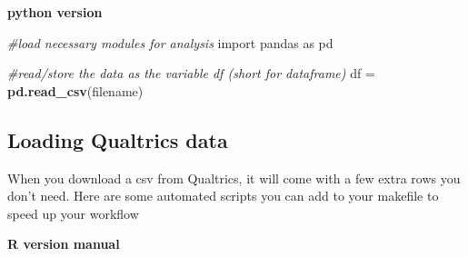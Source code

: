 \documentclass[]{book}
\newenvironment{Shaded}{\begin{snugshade}}{\end{snugshade}}
\newcommand{\CommentTok}[1]{\textcolor[rgb]{0.56,0.35,0.01}{\textit{#1}}}
\newcommand{\DataTypeTok}[1]{\textcolor[rgb]{0.13,0.29,0.53}{#1}}
\newcommand{\DecValTok}[1]{\textcolor[rgb]{0.00,0.00,0.81}{#1}}
\newcommand{\KeywordTok}[1]{\textcolor[rgb]{0.13,0.29,0.53}{\textbf{#1}}}
\newcommand{\NormalTok}[1]{#1}
\newcommand{\OperatorTok}[1]{\textcolor[rgb]{0.81,0.36,0.00}{\textbf{#1}}}
\newcommand{\StringTok}[1]{\textcolor[rgb]{0.31,0.60,0.02}{#1}}
\begin{document}
\textbf{python version}

\begin{Shaded}
\begin{Highlighting}[]
\CommentTok{#load necessary modules for analysis}
\NormalTok{import pandas as pd}

\CommentTok{#read/store the data as the variable df (short for dataframe)}
\NormalTok{df =}\StringTok{ }\KeywordTok{pd.read_csv}\NormalTok{(filename)}
\end{Highlighting}
\end{Shaded}

\hypertarget{loading-qualtrics-data}{%
\subsection{Loading Qualtrics data}\label{loading-qualtrics-data}}

When you download a csv from Qualtrics, it will come with a few extra rows you don't need. Here are some automated scripts you can add to your makefile to speed up your workflow

\textbf{R version manual}

\begin{Shaded}
\end{Shaded}
\end{document}
